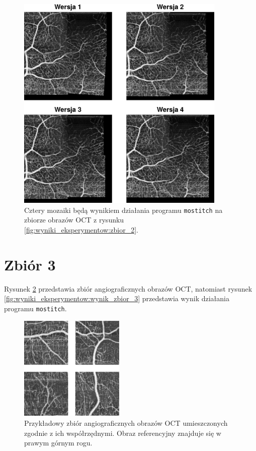 \begin{figure}[htb]
  \centering
  \includegraphics[width=10cm]{gfx/wynik_zbior_2}
  \caption{Cztery mozaiki będą wynikiem działania programu \texttt{mostitch} na zbiorze obrazów OCT z rysunku \ref{fig:wyniki_eksperymentow:zbior_2}.}
  \label{fig:wyniki_eksperymentow:wynik_zbior_2}
\end{figure}

\section{Zbiór 3}
\label{sec:zbior_3}

Rysunek \ref{fig:wyniki_eksperymentow:zbior_3} przedstawia zbiór angiograficznych obrazów OCT, natomiast rysunek \ref{fig:wyniki_eksperymentow:wynik_zbior_3} przedstawia wynik działania programu \texttt{mostitch}.

\begin{figure}[H]
  \centering
  \includegraphics[width=5cm]{gfx/zbior_3}
  \caption{Przykładowy zbiór angiograficznych obrazów OCT umieszczonych zgodnie z ich współrzędnymi. Obraz referencyjny znajduje się w prawym górnym rogu.}
  \label{fig:wyniki_eksperymentow:zbior_3}
\end{figure}

